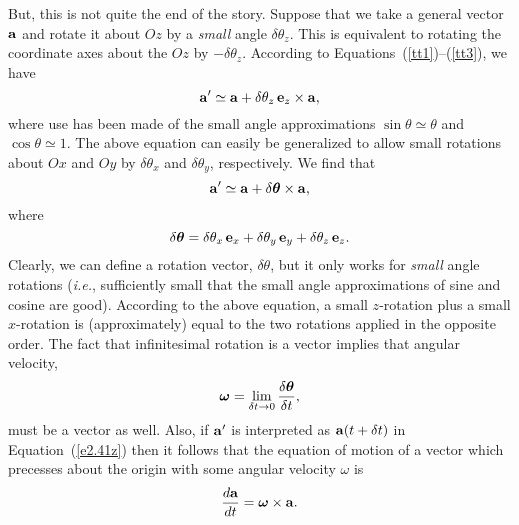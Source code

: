 But, this is not quite the end of the story. Suppose that we take a general vector
$\bf a$ and rotate it about $Oz$ by a {\em small}\/ angle $\delta \theta_z$.
This is equivalent to rotating the coordinate axes about the $Oz$ by $-\delta\theta_z$.
According to Equations~(\ref{tt1})--(\ref{tt3}), we have
\begin{equation}
{\bf a}' \simeq {\bf a} +\delta\theta_z \,{\bf e}_z\times {\bf a},
\end{equation}
where use has been made of the small angle approximations $\sin\theta \simeq \theta$
and $\cos\theta\simeq 1$. The above equation can easily be generalized to allow
small rotations about $Ox$ and $Oy$ by $\delta \theta_x$ and $\delta\theta_y$,
respectively. We find that
\begin{equation}\label{e2.41z}
{\bf a}' \simeq {\bf a} + \delta \mbox{\boldmath$\theta$}\times {\bf a},
\end{equation}
where
\begin{equation}
\delta\mbox{\boldmath$\theta$} = \delta\theta_x \,{\bf e}_x + \delta\theta_y \,{\bf e}_y + 
 \delta\theta_z \,{\bf e}_z.
\end{equation}
Clearly, we can define a rotation vector, \mbox{$\delta$\boldmath$\theta$}, but it only
works for {\em small}\/ angle rotations ({\em i.e.}, sufficiently small that the small
angle approximations of sine and cosine are good). According to the above equation,
a small $z$-rotation plus a small $x$-rotation is (approximately) equal to 
the two rotations applied in the opposite order. 
The fact that infinitesimal rotation is a vector implies that angular velocity,
\begin{equation}
\mbox{\boldmath$\omega$} = \lim_{\delta t\rightarrow 0} \frac{\delta 
\mbox{\boldmath$\theta$} }{\delta t},
\end{equation}
must be a vector as well. Also, if ${\bf a}'$ is interpreted as ${\bf a}(t+\delta t)$
in Equation~(\ref{e2.41z}) then it follows that the equation of motion of a vector
which precesses  about the origin with some angular velocity \mbox{\boldmath$\omega$} is
\begin{equation}
\frac{d {\bf a}}{dt} = \mbox{\boldmath$\omega$}\times {\bf a}.\label{e239}
\end{equation}

